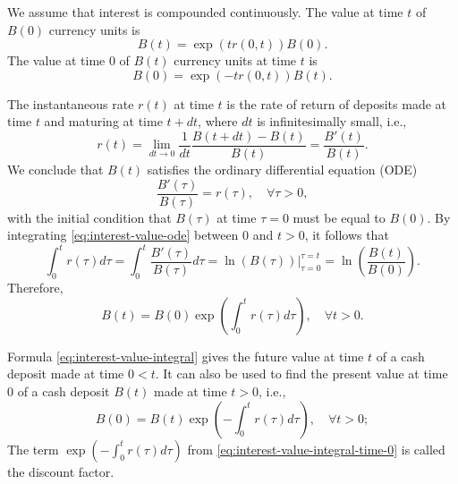 We assume that interest is compounded continuously.
The value at time $ t $ of $ B(0) $ currency units is
\begin{equation}
    B(t) = \exp (t r(0, t)) B(0).
    \label{eq:interest-value-time-t}
\end{equation}
The value at time 0 of $ B(t) $ currency units at time $ t $ is
\begin{equation}
    B(0) = \exp (-t r(0, t)) B(t).
    \label{eq:interest-value-time-0}
\end{equation}

The instantaneous rate $ r(t) $ at time $ t $ is the rate of return of deposits
    made at time $ t $ and maturing at time $ t + dt $, where $ dt $ is
    infinitesimally small, i.e.,
\begin{equation*}
    r(t) = \lim_{dt \rightarrow 0} \frac{1}{dt} \frac{B(t + dt) - B(t)}{B(t)} =
        \frac{B'(t)}{B(t)}.
\end{equation*}
We conclude that $ B(t) $ satisfies the ordinary differential equation (ODE)
\begin{equation}
    \frac{B'(\tau)}{B(\tau)} = r(\tau), \quad \forall \tau > 0,
    \label{eq:interest-value-ode}
\end{equation}
with the initial condition that $ B(\tau) $ at time $ \tau = 0 $ must be equal
    to $ B(0) $.
By integrating \eqref{eq:interest-value-ode} between 0 and $ t > 0 $, it follows
    that
\begin{equation*}
    \int_{0}^{t} r(\tau) d\tau = \int_{0}^{t} \frac{B'(\tau)}{B(\tau)} d\tau =
        \ln (B(\tau)) \rvert_{\tau=0}^{\tau=t} =
        \ln \left( \frac{B(t)}{B(0)} \right).
\end{equation*}
Therefore,
\begin{equation}
    B(t) = B(0) \exp \left( \int_{0}^{t} r(\tau) d\tau \right), \quad
        \forall t > 0.
    \label{eq:interest-value-integral}
\end{equation}

Formula \eqref{eq:interest-value-integral} gives the future value at time $ t $
    of a cash deposit made at time $ 0 < t $.
It can also be used to find the present value at time 0 of a cash deposit
    $ B(t) $ made at time $ t > 0 $, i.e.,
\begin{equation}
    B(0) = B(t) \exp \left( -\int_{0}^{t} r(\tau) d\tau \right), \quad
        \forall t > 0;
    \label{eq:interest-value-integral-time-0}
\end{equation}
The term $ \exp \left( -\int_{0}^{t} r(\tau) d\tau \right) $ from
    \eqref{eq:interest-value-integral-time-0} is called the discount factor.

